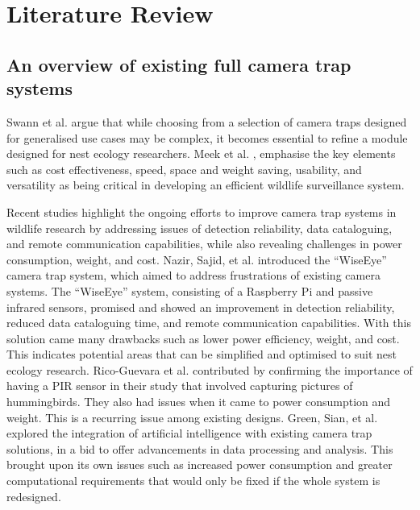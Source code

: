 \documentclass[class=report,11pt,crop=false]{standalone}
\begin{document}
\ifstandalone
\tableofcontents
\fi
\chapter{Literature Review \label{ch:literature}}

\section{An overview of existing full camera trap systems}


Swann et al. \cite{swann2011evaluating} argue that while choosing from a selection of camera traps designed for generalised use cases may be complex, it becomes essential to refine a module designed for nest ecology researchers. Meek et al. \cite{meek2012user}, emphasise the key elements such as cost effectiveness, speed, space and weight saving, usability, and versatility as being critical in developing an efficient wildlife surveillance system.  

Recent studies highlight the ongoing efforts to improve camera trap systems in wildlife research by addressing issues of detection reliability, data cataloguing, and remote communication capabilities, while also revealing challenges in power consumption, weight, and cost. Nazir, Sajid, et al. \cite{nazir2017wiseeye} introduced the “WiseEye” camera trap system, which aimed to address frustrations of existing camera systems. The “WiseEye” system, consisting of a Raspberry Pi and passive infrared sensors, promised and showed an improvement in detection reliability, reduced data cataloguing time, and remote communication capabilities. With this solution came many drawbacks such as lower power efficiency, weight, and cost. This indicates potential areas that can be simplified and optimised to suit nest ecology research. Rico-Guevara et al. \cite{rico-guevara2017bring} contributed by confirming the importance of having a PIR sensor in their study that involved capturing pictures of hummingbirds. They also had issues when it came to power consumption and weight. This is a recurring issue among existing designs. Green, Sian, et al. \cite{green2020innovations} explored the integration of artificial intelligence with existing camera trap solutions, in a bid to offer advancements in data processing and analysis. This brought upon its own issues such as increased power consumption and greater computational requirements that would only be fixed if the whole system is redesigned. 
\end{document}
